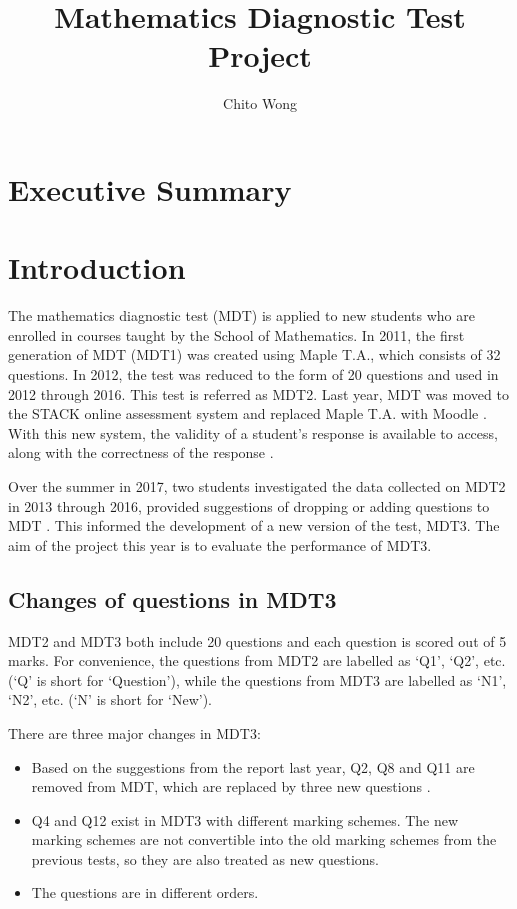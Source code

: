 \documentclass[a4paper]{report}
\title{Mathematics Diagnostic Test Project}
\author{Chito Wong}
\begin{document}
\maketitle

\setcounter{page}{1}
\tableofcontents
\newpage

\chapter*{Executive Summary}
\setcounter{page}{1}

\chapter{Introduction}

The mathematics diagnostic test (MDT) is applied to new students who are enrolled in courses taught by the School of Mathematics. In 2011, the first generation of MDT (MDT1) was created using Maple T.A., which consists of 32 questions. In 2012, the test was reduced to the form of 20 questions and used in 2012 through 2016. This test is referred as MDT2. Last year, MDT was moved to the STACK online assessment system and replaced Maple T.A. with Moodle \cite{web:mdt}. With this new system, the validity of a student's response is available to access, along with the correctness of the response \cite{web:stack}. 

Over the summer in 2017, two students investigated the data collected on MDT2 in 2013 through 2016, provided suggestions of dropping or adding questions to MDT \cite{lastyear}. This informed the development of a new version of the test, MDT3. The aim of the project this year is to evaluate the performance of MDT3. 

\section{Changes of questions in MDT3}

MDT2 and MDT3 both include 20 questions and each question is scored out of 5 marks. For convenience, the questions from MDT2 are labelled as `Q1', `Q2', etc. (`Q' is short for `Question'), while the questions from MDT3 are labelled as `N1', `N2', etc. (`N' is short for `New'). 

There are three major changes in MDT3: 
\begin{itemize}
\item Based on the suggestions from the report last year, Q2, Q8 and Q11 are removed from MDT, which are replaced by three new questions \cite{lastyear}. 

\item Q4 and Q12 exist in MDT3 with different marking schemes. The new marking schemes are not convertible into the old marking schemes from the previous tests, so they are also treated as new questions. 

\item The questions are in different orders. 
\end{itemize}
\end{document}
